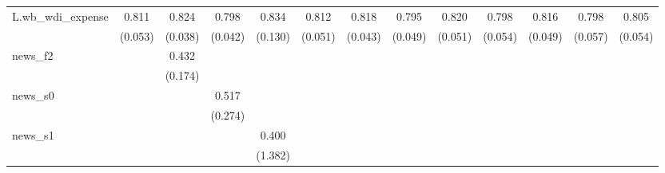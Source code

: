 {\begin{tabular}{l*{12}{c}}
\addlinespace
L.wb\_wdi\_expense&       0.811\sym{***}&       0.824\sym{***}&       0.798\sym{***}&       0.834\sym{***}&       0.812\sym{***}&       0.818\sym{***}&       0.795\sym{***}&       0.820\sym{***}&       0.798\sym{***}&       0.816\sym{***}&       0.798\sym{***}&       0.805\sym{***}\\
            &     (0.053)         &     (0.038)         &     (0.042)         &     (0.130)         &     (0.051)         &     (0.043)         &     (0.049)         &     (0.051)         &     (0.054)         &     (0.049)         &     (0.057)         &     (0.054)         \\
\addlinespace
news\_f2     &                     &       0.432\sym{**} &                     &                     &                     &                     &                     &                     &                     &                     &                     &                     \\
            &                     &     (0.174)         &                     &                     &                     &                     &                     &                     &                     &                     &                     &                     \\
\addlinespace
news\_s0     &                     &                     &       0.517\sym{*}  &                     &                     &                     &                     &                     &                     &                     &                     &                     \\
            &                     &                     &     (0.274)         &                     &                     &                     &                     &                     &                     &                     &                     &                     \\
\addlinespace
news\_s1     &                     &                     &                     &       0.400         &                     &                     &                     &                     &                     &                     &                     &                     \\
            &                     &                     &                     &     (1.382)         &                     &                     &                     &                     &                     &                     &                     &                     \\

\end{tabular}}
